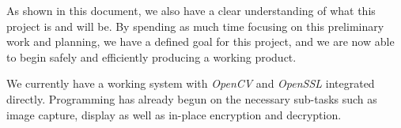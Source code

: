 \documentclass[11pt, a4paper,titlepage]{report}
\begin{document}
As shown in this document, we also have a clear understanding of what this project is and will be. By spending as much time focusing on this preliminary work and planning, we have a defined goal for this project, and we are now able to begin safely and efficiently producing a working product.

We currently have a working system with \emph{OpenCV} and \emph{OpenSSL} integrated directly. Programming has already begun on the necessary sub-tasks such as image capture, display as well as in-place encryption and decryption.


\printbibliography 
\nocite{*}
\end{document}
